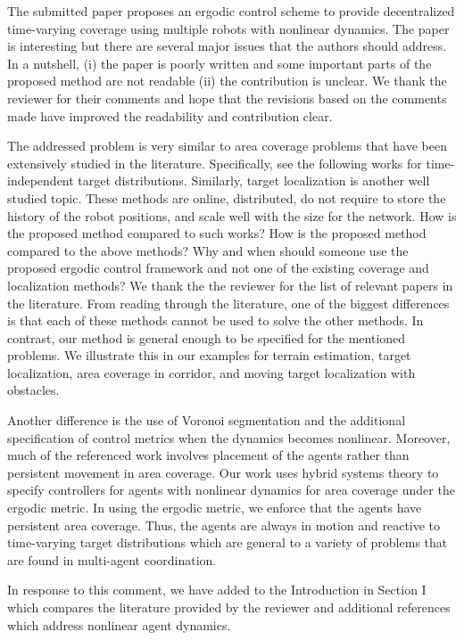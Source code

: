 \documentclass[10pt]{article}
\begin{document}
\begin{response}{The submitted paper proposes an ergodic control scheme	to provide
decentralized time-varying coverage using multiple robots with
nonlinear dynamics.  The paper is interesting but there are several
major issues that the authors should address. In a nutshell, (i) the
paper is poorly written and some important parts of the proposed method
are not readable (ii) the contribution is unclear.}
We thank the reviewer for their comments and hope that the revisions based on the comments made have improved the readability and contribution clear.
\end{response}


\begin{response}{
The addressed problem is very similar to area coverage problems that have been extensively studied in the literature. 
Specifically, see the following works for time-independent target distributions.
Similarly, target localization is another well studied topic.
These methods are online, distributed, do not require to store the history of the robot positions, and scale well with the size for the network. 
How is the proposed method compared to such works?
How is the proposed method compared to the above methods? 
Why and when should someone use the proposed ergodic control framework and not one of the existing coverage and localization methods?
}
We thank the the reviewer for the list of relevant papers in the literature. 
From reading through the literature, one of the biggest differences is that each of these methods cannot be used to solve the other methods. 
In contrast, our method is general enough to be specified for the mentioned problems.
We illustrate this in our examples for terrain estimation, target localization, area coverage in corridor, and moving target localization with obstacles.

Another difference is the use of Voronoi segmentation and the additional specification of control metrics when the dynamics becomes nonlinear.
Moreover, much of the referenced work involves placement of the agents rather than persistent movement in area coverage.
Our work uses hybrid systems theory to specify controllers for agents with nonlinear dynamics for area coverage under the ergodic metric.
In using the ergodic metric, we enforce that the agents have persistent area coverage. 
Thus, the agents are always in motion and reactive to time-varying target distributions which are general to a variety of problems that are found in multi-agent coordination. 

In response to this comment, we have added to the Introduction in Section I which compares the literature provided by the reviewer and additional references which address nonlinear agent dynamics.
\end{response}
\end{document}
